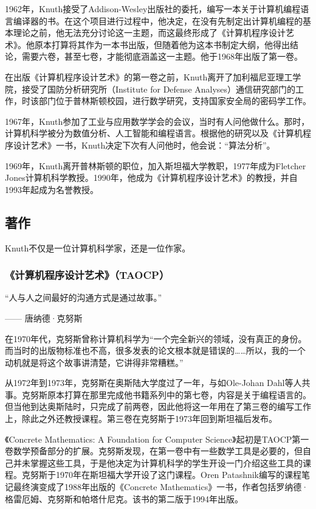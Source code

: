 1962年，Knuth接受了Addison-Wesley出版社的委托，编写一本关于计算机编程语言编译器的书。在这个项目进行过程中，他决定，在没有先制定出计算机编程的基本理论之前，他无法充分讨论这一主题，而这最终形成了《计算机程序设计艺术》。他原本打算将其作为一本书出版，但随着他为这本书制定大纲，他得出结论，需要六卷，甚至七卷，才能彻底涵盖这一主题。他于1968年出版了第一卷。

在出版《计算机程序设计艺术》的第一卷之前，Knuth离开了加利福尼亚理工学院，接受了国防分析研究所（Institute for Defense Analyses）通信研究部门的工作，时该部门位于普林斯顿校园，进行数学研究，支持国家安全局的密码学工作。

1967年，Knuth参加了工业与应用数学学会的会议，当时有人问他做什么。那时，计算机科学被分为数值分析、人工智能和编程语言。根据他的研究以及《计算机程序设计艺术》一书，Knuth决定下次有人问他时，他会说：“算法分析”。

1969年，Knuth离开普林斯顿的职位，加入斯坦福大学教职，1977年成为Fletcher Jones计算机科学教授。1990年，他成为《计算机程序设计艺术》的教授，并自1993年起成为名誉教授。
\subsection{著作}
Knuth不仅是一位计算机科学家，还是一位作家。
\subsubsection{《计算机程序设计艺术》（TAOCP）}

“人与人之间最好的沟通方式是通过故事。”

—— 唐纳德·克努斯

在1970年代，克努斯曾称计算机科学为“一个完全新兴的领域，没有真正的身份。而当时的出版物标准也不高，很多发表的论文根本就是错误的……所以，我的一个动机就是将这个故事讲清楚，它讲得非常糟糕。”

从1972年到1973年，克努斯在奥斯陆大学度过了一年，与如Ole-Johan Dahl等人共事。克努斯原本打算在那里完成他书籍系列中的第七卷，内容是关于编程语言的。但当他到达奥斯陆时，只完成了前两卷，因此他将这一年用在了第三卷的编写工作上，除此之外还教授课程。第三卷在克努斯于1973年回到斯坦福后发布。

《Concrete Mathematics: A Foundation for Computer Science》起初是TAOCP第一卷数学预备部分的扩展。克努斯发现，在第一卷中有一些数学工具是必要的，但自己并未掌握这些工具，于是他决定为计算机科学的学生开设一门介绍这些工具的课程。克努斯于1970年在斯坦福大学开设了这门课程。Oren Patashnik编写的课程笔记最终演变成了1988年出版的《Concrete Mathematics》一书，作者包括罗纳德·格雷厄姆、克努斯和帕塔什尼克。该书的第二版于1994年出版。


